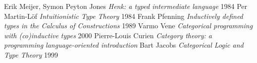 \documentclass[11pt,oneside]{article}
\begin{document}
\begin{thebibliography}{9}

       Erik Meijer, Symon Peyton Jones \textit{Henk: a typed intermediate language} 1984
        Per Martin-Löf \textit{Intuitionistic Type Theory} 1984
   Frank Pfenning \textit{Inductively defined types in the Calculus of Constructions} 1989
       Varmo Vene \textit{Categorical programming with (co)inductive types} 2000
    Pierre-Louis Curien \textit{Category theory: a programming language-oriented introduction}
     Bart Jacobs \textit{Categorical Logic and Type Theory} 1999

\end{thebibliography}
\end{document}
